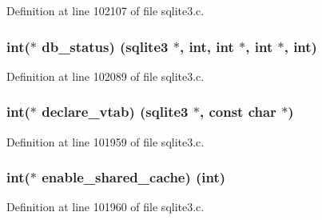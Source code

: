 Definition at line 102107 of file sqlite3.\+c.

\hypertarget{structsqlite3__api__routines_a84994959cfb23f6e01eb63c52836d3f3}{}
\subsubsection[{db\+\_\+status}]{\setlength{\rightskip}{0pt plus 5cm}int($\ast$ db\+\_\+status) ({\bf sqlite3} $\ast$, int, int $\ast$, int $\ast$, int)}\label{structsqlite3__api__routines_a84994959cfb23f6e01eb63c52836d3f3}


Definition at line 102089 of file sqlite3.\+c.

\hypertarget{structsqlite3__api__routines_ab96c11c4adf08d1f0bdcff2cb643796e}{}
\subsubsection[{declare\+\_\+vtab}]{\setlength{\rightskip}{0pt plus 5cm}int($\ast$ declare\+\_\+vtab) ({\bf sqlite3} $\ast$, const char $\ast$)}\label{structsqlite3__api__routines_ab96c11c4adf08d1f0bdcff2cb643796e}


Definition at line 101959 of file sqlite3.\+c.

\hypertarget{structsqlite3__api__routines_a59467cfa1e3c74205cea906d16629647}{}
\subsubsection[{enable\+\_\+shared\+\_\+cache}]{\setlength{\rightskip}{0pt plus 5cm}int($\ast$ enable\+\_\+shared\+\_\+cache) (int)}\label{structsqlite3__api__routines_a59467cfa1e3c74205cea906d16629647}


Definition at line 101960 of file sqlite3.\+c.

\hypertarget{structsqlite3__api__routines_a9cf1e23a3f17f5fdafb327194466cc80}{}
